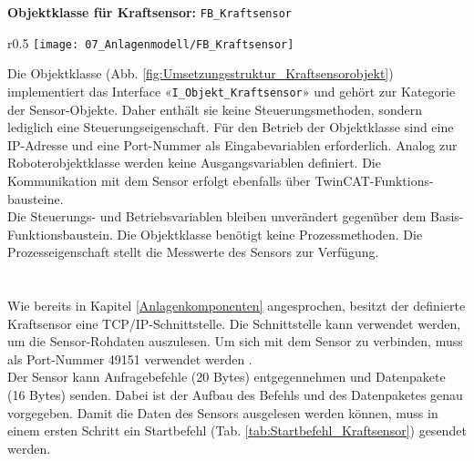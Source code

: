 		\textbf{Objektklasse für Kraftsensor:} \verb|FB_Kraftsensor|
		\vspace{2mm}
		\vspace{-10mm}  
		\\
		\begin{wrapfigure}{r}{0.5\textwidth}
			\centering
			\texttt{[image: 07\_Anlagenmodell/FB\_Kraftsensor]}
			\captionsetup{justification=centering}
			\caption{Umsetzungsstruktur von Kraftsensor-Objekt}
			\label{fig:Umsetzungsstruktur_Kraftsensorobjekt}
		\end{wrapfigure} \par
		Die Objektklasse (Abb. \ref{fig:Umsetzungsstruktur_Kraftsensorobjekt}) implementiert das Interface «\verb|I_Objekt_Kraftsensor|» und gehört zur Kategorie der Sensor-Objekte. Daher enthält sie keine Steuerungsmethoden, sondern lediglich eine Steuerungseigenschaft. Für den Betrieb der Objektklasse sind eine IP-Adresse und eine Port-Nummer als Eingabevariablen erforderlich. Analog zur Roboterobjektklasse werden keine Ausgangsvariablen definiert. Die Kommunikation mit dem Sensor erfolgt ebenfalls über TwinCAT-Funktions-bausteine.
		\\
		Die Steuerungs- und Betriebsvariablen bleiben unverändert gegenüber dem Basis-Funktionsbaustein.  Die Objektklasse benötigt keine Prozessmethoden. Die Prozesseigenschaft stellt die Messwerte des Sensors zur Verfügung. 
		\\
		\\
		\\
		Wie bereits in Kapitel \ref{Anlagenkomponenten} angesprochen, besitzt der definierte Kraftsensor eine TCP/IP-Schnittstelle. Die Schnittstelle kann verwendet werden, um die Sensor-Rohdaten auszulesen. Um sich mit dem Sensor zu verbinden, muss als Port-Nummer 49151 verwendet werden \cite{ComputeBox}. 
		\\
		Der Sensor kann Anfragebefehle (20 Bytes) entgegennehmen und Datenpakete (16 Bytes) senden. Dabei ist der Aufbau des Befehls und des Datenpaketes genau vorgegeben. Damit die Daten des Sensors ausgelesen werden können, muss in einem ersten Schritt ein Startbefehl (Tab. \ref{tab:Startbefehl_Kraftsensor}) gesendet werden. 
		

